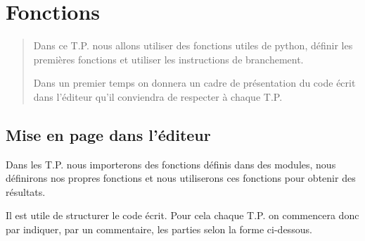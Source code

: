 \chapter{Fonctions}
\thispagestyle{empty}
\begin{abstract} Dans ce T.P. nous allons utiliser des fonctions utiles de python, définir les premières fonctions et utiliser les instructions de branchement.

Dans un premier temps on donnera un cadre de présentation du code écrit dans l'éditeur qu'il conviendra de respecter à chaque T.P.
\end{abstract}
\section{Mise en page dans l'éditeur} 
Dans les T.P. nous importerons des fonctions définis dans des modules, nous définirons nos propres fonctions et nous utiliserons ces fonctions pour obtenir des résultats. 

Il est utile de structurer le code écrit. Pour cela chaque T.P. on commencera donc par indiquer, par un commentaire, les parties selon la forme ci-dessous.

